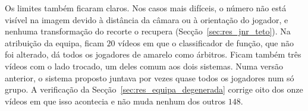 Os limites também ficaram claros. Nos casos mais difíceis, o número não está visível na imagem devido à distância da câmara ou à orientação do jogador, e nenhuma transformação do recorte o recupera (Secção~\ref{sec:res_jnr_teto}). Na atribuição da equipa, ficam $20$ vídeos em que o classificador de função, que não foi alterado, dá todos os jogadores de amarelo como árbitros. Ficam também três vídeos com o lado trocado, um deles comum aos dois sistemas. Numa versão anterior, o sistema proposto juntava por vezes quase todos os jogadores num só grupo. A verificação da Secção~\ref{sec:res_equipa_degenerada} corrige oito dos onze vídeos em que isso acontecia e não muda nenhum dos outros $148$.